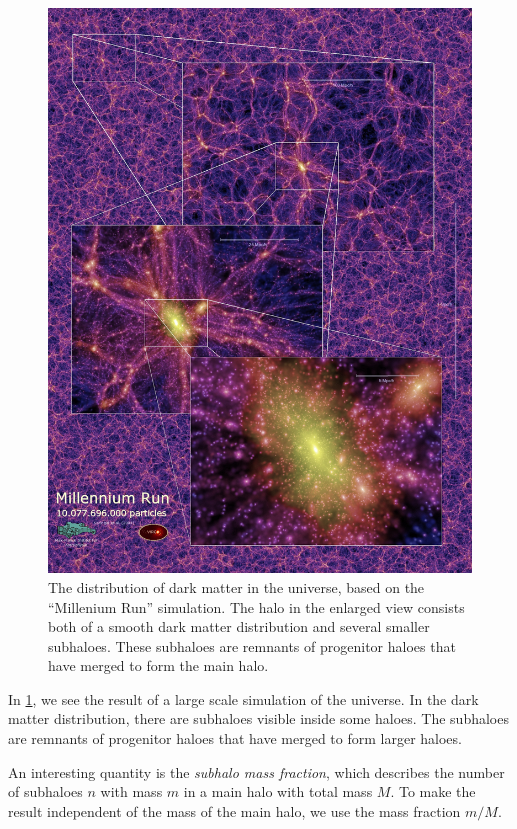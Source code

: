 \begin{figure}
	\includegraphics[width=\textwidth]{img/ch-04/millenium-run.png}
	\caption{The distribution of dark matter in the universe, based on the \enquote{Millenium Run} simulation. The halo in the enlarged view consists both of a smooth dark matter distribution and several smaller subhaloes. These subhaloes are remnants of progenitor haloes that have merged to form the main halo.}
	\label{fig:millenium-run}
\end{figure}

In \cref{fig:millenium-run}, we see the result of a large scale simulation of the universe.
In the dark matter distribution, there are subhaloes visible inside some haloes.
The subhaloes are remnants of progenitor haloes that have merged to form larger haloes.


An interesting quantity is the \emph{subhalo mass fraction}, which describes the number of subhaloes $n$ with mass $m$ in a main halo with total mass $M$.
To make the result independent of the mass of the main halo, we use the mass fraction $m/M$.


